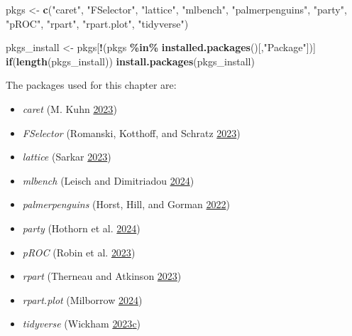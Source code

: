 \documentclass[
  notitlepage]{book}
\newenvironment{Shaded}{\begin{snugshade}}{\end{snugshade}}
\newcommand{\ControlFlowTok}[1]{\textcolor[rgb]{0.13,0.29,0.53}{\textbf{#1}}}
\newcommand{\KeywordTok}[1]{\textcolor[rgb]{0.13,0.29,0.53}{\textbf{#1}}}
\newcommand{\NormalTok}[1]{#1}
\newcommand{\OperatorTok}[1]{\textcolor[rgb]{0.81,0.36,0.00}{\textbf{#1}}}
\newcommand{\StringTok}[1]{\textcolor[rgb]{0.31,0.60,0.02}{#1}}
\providecommand{\tightlist}{%
  \setlength{\itemsep}{0pt}\setlength{\parskip}{0pt}}
\begin{document}
\begin{Shaded}
\begin{Highlighting}[]
\NormalTok{pkgs \textless{}{-}}\StringTok{ }\KeywordTok{c}\NormalTok{(}\StringTok{"caret"}\NormalTok{, }\StringTok{"FSelector"}\NormalTok{, }\StringTok{"lattice"}\NormalTok{, }\StringTok{"mlbench"}\NormalTok{, }
          \StringTok{"palmerpenguins"}\NormalTok{, }\StringTok{"party"}\NormalTok{, }\StringTok{"pROC"}\NormalTok{, }\StringTok{"rpart"}\NormalTok{, }
          \StringTok{"rpart.plot"}\NormalTok{, }\StringTok{"tidyverse"}\NormalTok{)}

\NormalTok{pkgs\_install \textless{}{-}}\StringTok{ }\NormalTok{pkgs[}\OperatorTok{!}\NormalTok{(pkgs }\OperatorTok{\%in\%}\StringTok{ }\KeywordTok{installed.packages}\NormalTok{()[,}\StringTok{"Package"}\NormalTok{])]}
\ControlFlowTok{if}\NormalTok{(}\KeywordTok{length}\NormalTok{(pkgs\_install)) }\KeywordTok{install.packages}\NormalTok{(pkgs\_install)}
\end{Highlighting}
\end{Shaded}

The packages used for this chapter are:

\begin{itemize}
\tightlist
\item
  \emph{caret} (M. Kuhn \protect\hyperlink{ref-R-caret}{2023})
\item
  \emph{FSelector} (Romanski, Kotthoff, and Schratz \protect\hyperlink{ref-R-FSelector}{2023})
\item
  \emph{lattice} (Sarkar \protect\hyperlink{ref-R-lattice}{2023})
\item
  \emph{mlbench} (Leisch and Dimitriadou \protect\hyperlink{ref-R-mlbench}{2024})
\item
  \emph{palmerpenguins} (Horst, Hill, and Gorman \protect\hyperlink{ref-R-palmerpenguins}{2022})
\item
  \emph{party} (Hothorn et al. \protect\hyperlink{ref-R-party}{2024})
\item
  \emph{pROC} (Robin et al. \protect\hyperlink{ref-R-pROC}{2023})
\item
  \emph{rpart} (Therneau and Atkinson \protect\hyperlink{ref-R-rpart}{2023})
\item
  \emph{rpart.plot} (Milborrow \protect\hyperlink{ref-R-rpart.plot}{2024})
\item
  \emph{tidyverse} (Wickham \protect\hyperlink{ref-R-tidyverse}{2023}\protect\hyperlink{ref-R-tidyverse}{c})
\end{itemize}
\end{document}
